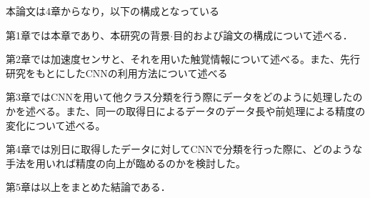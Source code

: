本論文は4章からなり，以下の構成となっている

第1章では本章であり、本研究の背景$\cdot$目的および論文の構成について述べる．

第2章では加速度センサと、それを用いた触覚情報について述べる。また、先行研究をもとにしたCNNの利用方法について述べる　%

第3章ではCNNを用いて他クラス分類を行う際にデータをどのように処理したのかを述べる。また、同一の取得日によるデータのデータ長や前処理による精度の変化について述べる。

第4章では別日に取得したデータに対してCNNで分類を行った際に、どのような手法を用いれば精度の向上が臨めるのかを検討した。

第5章は以上をまとめた結論である．
